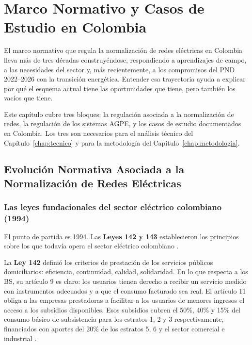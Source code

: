 
\chapter{Marco Normativo y Casos de Estudio en Colombia}
\label{chap:normativo}

El marco normativo que regula la normalización de redes eléctricas en Colombia lleva más de tres décadas construyéndose, respondiendo a aprendizajes de campo, a las necesidades del sector y, más recientemente, a los compromisos del PND 2022--2026 con la transición energética. Entender esa trayectoria ayuda a explicar por qué el esquema actual tiene las oportunidades que tiene, pero también los vacíos que tiene.

Este capítulo cubre tres bloques: la regulación asociada a la normalización de redes, la regulación de los sistemas AGPE, y los casos de estudio documentados en Colombia. Los tres son necesarios para el análisis técnico del Capítulo~\ref{chap:tecnico} y para la metodología del Capítulo~\ref{chap:metodologia}.


\section{Evolución Normativa Asociada a la Normalización de Redes Eléctricas}
\label{sec:normativa_normalizacion}

\subsection{Las leyes fundacionales del sector eléctrico colombiano (1994)}
\label{subsec:leyes_1994}

El punto de partida es 1994. Las \textbf{Leyes 142 y 143} establecieron los principios sobre los que todavía opera el sector eléctrico colombiano \parencite{Ley142_1994, Ley143_1994}.

La \textbf{Ley 142} definió los criterios de prestación de los servicios públicos domiciliarios: eficiencia, continuidad, calidad, solidaridad. En lo que respecta a los BS, su artículo 9 es claro: los usuarios tienen derecho a recibir un servicio medido con instrumentos adecuados y a que el consumo facturado sea real. El artículo 11 obliga a las empresas prestadoras a facilitar a los usuarios de menores ingresos el acceso a los subsidios disponibles. Esos subsidios cubren el 50\%, 40\% y 15\% del consumo básico de subsistencia para los estratos 1, 2 y 3 respectivamente, financiados con aportes del 20\% de los estratos 5, 6 y el sector comercial e industrial \parencite{Ley142_1994}.

